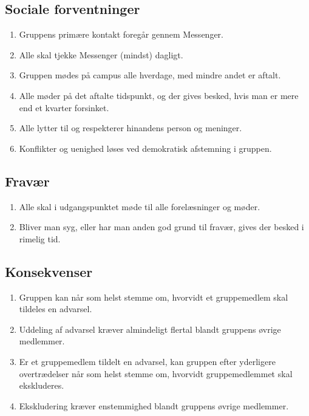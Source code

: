 \subsection*{Sociale forventninger}
\begin{enumerate}
    \item Gruppens primære kontakt foregår gennem Messenger.
    \item Alle skal tjekke Messenger (mindst) dagligt.
    \item Gruppen mødes på campus alle hverdage, med mindre andet er aftalt.
    \item Alle møder på det aftalte tidspunkt, og der gives besked, hvis man er mere end et kvarter forsinket.
    \item Alle lytter til og respekterer hinandens person og meninger.
    \item Konflikter og uenighed løses ved demokratisk afstemning i gruppen.
\end{enumerate}

\subsection*{Fravær}
\begin{enumerate}
    \item Alle skal i udgangspunktet møde til alle forelæsninger og møder.
    \item Bliver man syg, eller har man anden god grund til fravær, gives der besked i rimelig tid.
\end{enumerate}

\subsection*{Konsekvenser}
\begin{enumerate}
    \item Gruppen kan når som helst stemme om, hvorvidt et gruppemedlem skal tildeles en advarsel.
    \item Uddeling af advarsel kræver almindeligt flertal blandt gruppens øvrige medlemmer.
    \item Er et gruppemedlem tildelt en advarsel, kan gruppen efter yderligere overtrædelser når som helst stemme om, hvorvidt gruppemedlemmet skal ekskluderes.
    \item Ekskludering kræver enstemmighed blandt gruppens øvrige medlemmer.
\end{enumerate}

\renewcommand*{\theenumi}{\arabic{enumi}}
